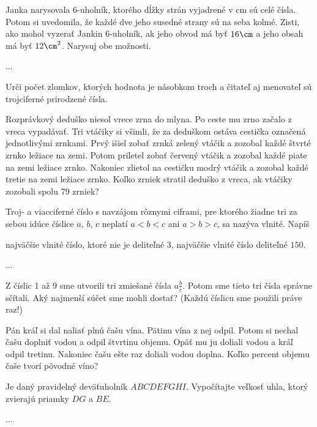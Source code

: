 {%
Janka narysovala 6-uholník, ktorého dĺžky strán vyjadrené v cm sú celé čísla. Potom si
uvedomila, že každé dve jeho susedné strany sú na seba kolmé. Zisti, ako mohol vyzerať
Jankin 6-uholník, ak jeho obvod má byť $16\cm$ a jeho obsah má byť $12\cm^2$. Narysuj obe
možnosti.}

{%
...}

{%
Urči počet zlomkov, ktorých hodnota je násobkom troch
a čitateľ aj menovateľ sú trojciferné prirodzené čísla.}

{%
Rozprávkový deduško niesol vrece zrna do mlyna. Po ceste mu zrno začalo z vreca vypadávať.
Tri vtáčiky si všimli, že za deduškom ostáva cestička označená jednotlivými zrnkami. Prvý
išiel zobať zrnká zelený vtáčik a zozobal každé štvrté zrnko ležiace na zemi. Potom priletel
zobať červený vtáčik a zozobal každé piate na zemi ležiace zrnko. Nakoniec zlietol na cestičku
modrý vtáčik a zozobal každé tretie na zemi ležiace zrnko. Koľko zrniek stratil deduško
z vreca, ak vtáčiky zozobali spolu 79 zrniek?}

{%
Troj- a viacciferné číslo s navzájom rôznymi ciframi, pre ktorého žiadne tri za sebou idúce
číslice $a$, $b$, $c$ neplatí $a<b<c$ ani $a>b>c$, sa nazýva vlnité. Napíš
\begin{itemize}
 najväčšie vlnité číslo, ktoré nie je deliteľné $3$,
 najväčšie vlnité číslo deliteľné $150$.
\end{itemize}
}

{%
...}

{%
Z číslic 1 až 9 sme utvorili tri zmiešané čísla $a\frac bc$. Potom sme tieto tri čísla správne sčítali. Aký
najmenší súčet sme mohli dostať?
(Každú číslicu sme použili práve raz!)}

{%
Pán kráľ si dal naliať plnú čašu vína. Pätinu vína z nej odpil. Potom si nechal čašu doplniť
vodou a odpil štvrtinu objemu. Opäť mu ju doliali vodou a kráľ odpil tretinu. Nakoniec čašu
ešte raz doliali vodou doplna. Koľko percent objemu čaše tvorí pôvodné víno?}

{%
Je daný pravidelný deväťuholník $ABCDEFGHI$. Vypočítajte veľkosť uhla, ktorý zvierajú
priamky $DG$ a $BE$.}

{%
...}

